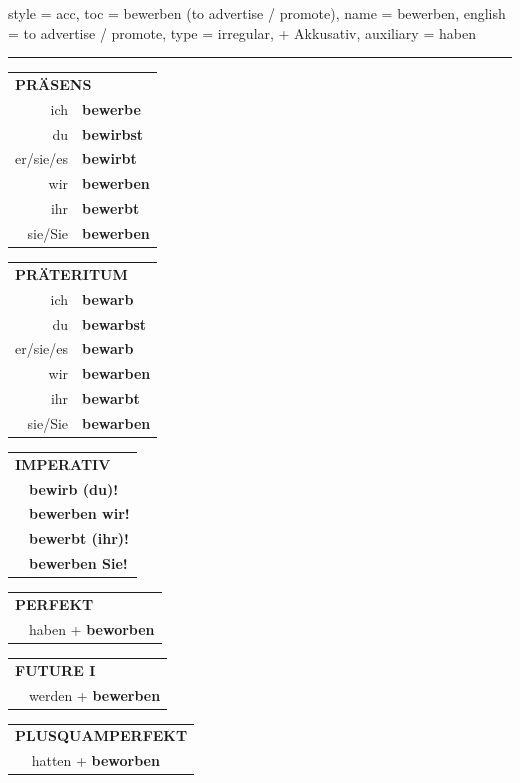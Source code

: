 \begin{verbentry}{
  style = {acc},
  toc = {bewerben (to advertise / promote)},
  name = {bewerben},
  english = {to advertise / promote},
  type = {irregular, + Akkusativ},
  auxiliary = {haben}
}


\vspace{5pt}
\hrule
\vspace{5pt}

\begin{tabular}{rl}
\multicolumn{2}{l}{\textbf{PRÄSENS}}\\
ich & \textbf{bewerbe}\\
du & \textbf{bewirbst}\\
er/sie/es & \textbf{bewirbt}\\
wir & \textbf{bewerben}\\
ihr & \textbf{bewerbt}\\
sie/Sie & \textbf{bewerben}\\
\end{tabular}
\hfill
\begin{tabular}{rl}
\multicolumn{2}{l}{\textbf{PRÄTERITUM}}\\
ich & \textbf{bewarb}\\
du & \textbf{bewarbst}\\
er/sie/es & \textbf{bewarb}\\
wir & \textbf{bewarben}\\
ihr & \textbf{bewarbt}\\
sie/Sie & \textbf{bewarben}\\
\end{tabular}
\hfill
\begin{tabular}{rl}
\multicolumn{2}{l}{\textbf{IMPERATIV}}\\
& \textbf{bewirb (du)!}\\
& \textbf{bewerben wir!}\\
& \textbf{bewerbt (ihr)!}\\
& \textbf{bewerben Sie!}\\
\end{tabular}

\vspace{10pt}

\begin{tabular}{rl}
\multicolumn{2}{l}{\textbf{PERFEKT}}\\
& haben + \textbf{beworben}\\
\end{tabular}
\hfill
\begin{tabular}{rl}
\multicolumn{2}{l}{\textbf{FUTURE I}}\\
& werden + \textbf{bewerben}\\
\end{tabular}
\hfill
\begin{tabular}{rl}
\multicolumn{2}{l}{\textbf{PLUSQUAMPERFEKT}}\\
& hatten + \textbf{beworben}\\
\end{tabular}


\end{verbentry}
